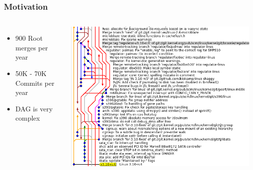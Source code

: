 \documentclass[15pt]{beamer}
\title{\TheTitle}
\subtitle{\TheSubtitle}
\author[Wilde, German]{\TheAuthors}
\institute{University of Victoria}
\date{}
\begin{document}
\frame{\titlepage}

\begin{frame}
  \frametitle{Motivation}
  \begin{columns}
    \begin{itemize}
      \item 900 Root merges per year
      \item 50K - 70K Commits per year
      \item DAG is very complex
    \end{itemize}
    \includegraphics[width=\textwidth]{figures/042dd_DAG.png}
  \end{columns}
\end{frame}
\end{document}
